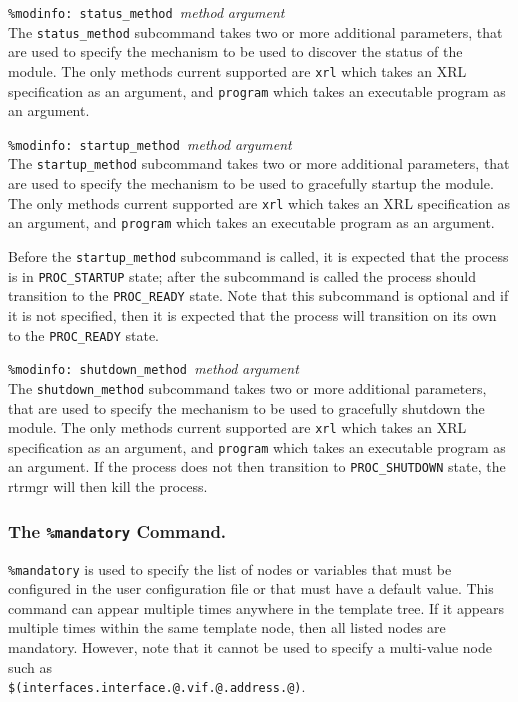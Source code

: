 \documentclass[11pt]{article}
\begin{document}
\begin{description}
  \item {{\tt \%modinfo: status\_method }{\it method }{\it argument}} \\
  The {\tt status\_method} subcommand takes two or more additional parameters,
  that are used to specify the mechanism to be used to discover the status of
  the module.
  The only methods current supported are {\tt xrl} which takes an XRL
  specification as an argument, and {\tt program} which takes an executable
  program as an argument.

  \item {{\tt \%modinfo: startup\_method }{\it method }{\it argument}} \\
  The {\tt startup\_method} subcommand takes two or more additional parameters,
  that are used to specify the mechanism to be used to gracefully startup the
  module. The only methods current supported are {\tt xrl} which takes an XRL
  specification as an argument, and {\tt program} which takes an executable
  program as an argument.

  Before the {\tt startup\_method} subcommand is called, it is expected
  that the process is in {\tt PROC\_STARTUP} state; after the subcommand
  is called the process should transition to the {\tt PROC\_READY} state.
  Note that this subcommand is optional and if it is not specified, then
  it is expected that the process will transition on its own to the
  {\tt PROC\_READY} state.

  \item {{\tt \%modinfo: shutdown\_method }{\it method }{\it argument}} \\
  The {\tt shutdown\_method} subcommand takes two or more additional
  parameters, that are used to specify the mechanism to be used to gracefully
  shutdown the module. The only methods current supported are {\tt xrl} which
  takes an XRL specification as an argument, and {\tt program} which takes an
  executable program as an argument.
  If the process does not then transition to {\tt PROC\_SHUTDOWN} state, the
  rtrmgr will then kill the process.

\end{description}

\subsubsection{The {\tt \%mandatory} Command.}

{\tt \%mandatory} is used to specify the list of nodes or variables
that must be configured in the user configuration file or that must
have a default value. This command can appear multiple times anywhere in the
template tree. If it appears multiple times within the same template node,
then all listed nodes are mandatory. However, note that it cannot be used
to specify a multi-value node such as\\
{\tt \$(interfaces.interface.@.vif.@.address.@)}.
\end{document}
